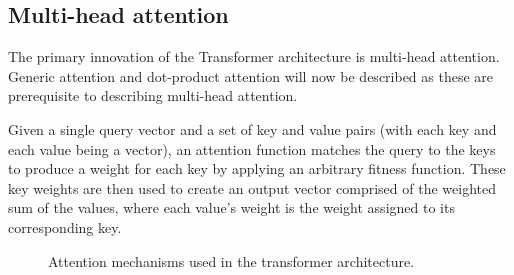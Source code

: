 \subsection{Multi-head attention} \label{multihead_attention}
The primary innovation of the Transformer architecture is multi-head attention.
Generic attention and dot-product attention will now be described as these are prerequisite to describing multi-head attention.

Given a single query vector and a set of key and value pairs (with each key and each value being a vector), an attention function matches the query to the keys to produce a weight for each key by applying an arbitrary fitness function.
These key weights are then used to create an output vector comprised of the weighted sum of the values, where each value's weight is the weight assigned to its corresponding key. 

\begin{figure}[htbp]
	\centering
	\quad\quad
	\caption{Attention mechanisms used in the transformer architecture.}
	\label{fig:multihead}
\end{figure}

